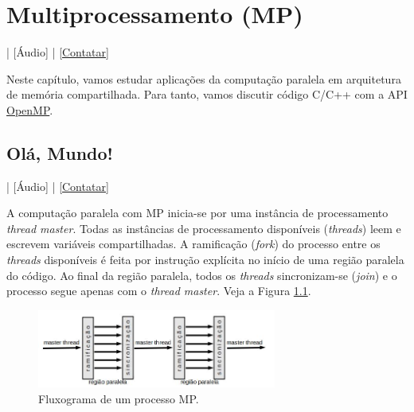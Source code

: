 
\chapter{Multiprocessamento (MP)}\label{cap_mp}
\thispagestyle{fancy}

\begin{flushright}
  [Vídeo] | [Áudio] | \href{https://phkonzen.github.io/notas/contato.html}{[Contatar]}
\end{flushright}

Neste capítulo, vamos estudar aplicações da computação paralela em arquitetura de memória compartilhada. Para tanto, vamos discutir código C/C++ com a API \href{https://www.openmp.org/}{OpenMP}.

\section{Olá, Mundo!}\label{sec_ola_cap_mp}

\begin{flushright}
  [Vídeo] | [Áudio] | \href{https://phkonzen.github.io/notas/contato.html}{[Contatar]}
\end{flushright}

A computação paralela com MP inicia-se por uma instância de processamento \emph{thread master}. Todas as instâncias de processamento disponíveis (\emph{threads}) leem e escrevem variáveis compartilhadas. A ramificação ({\it fork}) do processo entre os {\it threads} disponíveis é feita por instrução explícita no início de uma região paralela do código. Ao final da região paralela, todos os {\it threads} sincronizam-se ({\it join}) e o processo segue apenas com o {\it thread master}. Veja a Figura \ref{fig:mpwf}.

\begin{figure}[H]
  \centering
  \includegraphics[width=0.7\textwidth]{./cap_mp/dados/fig_mpwf/mpwf}
  \caption{Fluxograma de um processo MP.}
  \label{fig:mpwf}
\end{figure}

